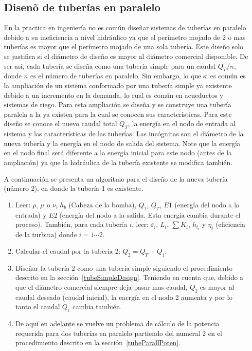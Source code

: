 \documentclass[10pt, oneside]{article}
\begin{document}
\subsection{Disen\~o de  tuber\'ias en paralelo}
En la practica en ingenier\'ia no es com\'un dise\~nar sistemas de tuber\'ias en paralelo debido a su ineficiencia a nivel hidr\'aulico ya que el per\'imetro mojado de 2 o mas tuber\'ias es mayor que el per\'imetro mojado de una sola tuber\'ia. Este dise\~no solo se justifica si el di\'ametro de dise\~no es mayor al di\'ametro comercial disponible. De ser as\'i, cada tuber\'ia se dise\~na como una tuber\'ia simple para un caudal $Q_T/n$, donde $n$ es el n\'umero de tuber\'ias en paralelo. Sin embargo, lo que si es com\'un es la ampliaci\'on de un sistema conformado por una tuber\'ia simple ya existente debido a un incremento en la demanda, lo cual es com\'un en acueductos y sistemas de riego. Para esta ampliaci\'on se dise\~na y se construye una tuber\'ia paralela a la ya existen para la cual se conocen sus caracter\'isticas. Para este dise\~no se conoce el nuevo caudal total $Q_T$, la energ\'ia en el nodo de entrada al sistema y las caracter\'isticas de las tuber\'ias. Las inc\'ognitas son el di\'ametro de la nueva tuber\'ia y la energ\'ia en el nodo de salida del sistema. Note que la energ\'ia en el nodo final ser\'a diferente a la energ\'ia inicial para este nodo (antes de la ampliaci\'on) ya que la hidr\'aulica de la tuber\'ia existente se modifica tambi\'en.

A continuaci\'on se presenta un algoritmo para el dise\~no de la nueva tuber\'ia (n\'umero 2), en donde la tuber\'ia 1 es existente.

\begin{enumerate}
\item Leer: $\rho$, $\mu$ o $\nu$, $h_b$ (Cabeza de la bomba), $Q_1$, $Q_T$, $E1$ (energ\'ia del nodo a la entrada) y $E2$ (energ\'ia del nodo a la salida. Esta energ\'ia cambia durante el proceso). Tambi\'en, para cada tuber\'ia $i$, leer: $\varepsilon_i$, $L_i$, $\sum K_i$, $h_{t_i}$ y $\eta_i$ (eficiencia de la turbina) donde $i=1 \cdots 2$.
\item Calcular el caudal por la tuber\'ia 2: $Q_2 = Q_T - Q_1$.
\item Dise\~nar la tuber\'ia 2 como una tuber\'ia simple siguiendo el procedimiento descrito en la secci\'on~\ref{tubeSimpleDesign}. Teniendo en cuenta que, debido a que el di\'ametro comercial siempre deja pasar mas caudal, $Q_2$ es mayor al caudal deseado (caudal inicial), la energ\'ia en el nodo 2 aumenta y por lo tanto el caudal $Q_1$ cambia tambi\'en.
\item De aqu\'i en adelante se vuelve un problema de c\'alculo de la potencia requerida para dos tuber\'ias en paralelo partiendo del numeral 2 en el procedimiento descrito en la secci\'on~\ref{tubeParallPoten}. 
\end{enumerate}
\end{document}
